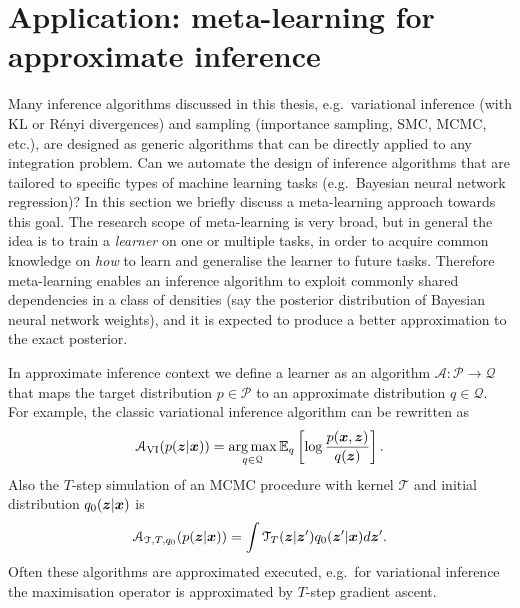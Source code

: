 \section{Application: meta-learning for approximate inference}
\label{sec:chap5_wild_applications}

Many inference algorithms discussed in this thesis, e.g.~variational inference (with KL or R{\'e}nyi divergences) and sampling (importance sampling, SMC, MCMC, etc.), are designed as generic algorithms that can be directly applied to any integration problem. Can we automate the design of inference algorithms that are tailored to specific types of machine learning tasks (e.g.~Bayesian neural network regression)? In this section we briefly discuss a meta-learning \citep{schmidhuber:thesis1987, bengio:meta1992, naik:meta1992, thrun:meta1998} approach towards this goal.
%
The research scope of meta-learning is very broad, but in general the idea is to train a \emph{learner} on one or multiple tasks, in order to acquire common knowledge on \emph{how} to learn and generalise the learner to future tasks. Therefore meta-learning enables an inference algorithm to exploit commonly shared dependencies in a class of densities (say the posterior distribution of Bayesian neural network weights), and it is expected to produce a better approximation to the exact posterior.

In approximate inference context we define a learner as an algorithm $\mathcal{A}: \mathcal{P} \rightarrow \mathcal{Q}$ that maps the target distribution $p \in \mathcal{P}$ to an approximate distribution $q \in \mathcal{Q}$. For example, the classic variational inference algorithm can be rewritten as
\begin{equation}
\mathcal{A}_{\text{VI}}(p(\bm{z} | \bm{x})) = \operatorname*{arg\,max}_{q \in \mathcal{Q}} \mathbb{E}_q \left[ \log \frac{p(\bm{x}, \bm{z})}{q(\bm{z})} \right].
\end{equation}
Also the $T$-step simulation of an MCMC procedure with kernel $\mathcal{T}$ and initial distribution $q_0(\bm{z} | \bm{x})$ is 
\begin{equation}
\mathcal{A}_{\mathcal{T}, T, q_0}(p(\bm{z} | \bm{x})) = \int \mathcal{T}_T(\bm{z} | \bm{z}') q_0(\bm{z}' | \bm{x}) d\bm{z}' .
\end{equation}
Often these algorithms are approximated executed, e.g.~for variational inference the maximisation operator is approximated by $T$-step gradient ascent.

